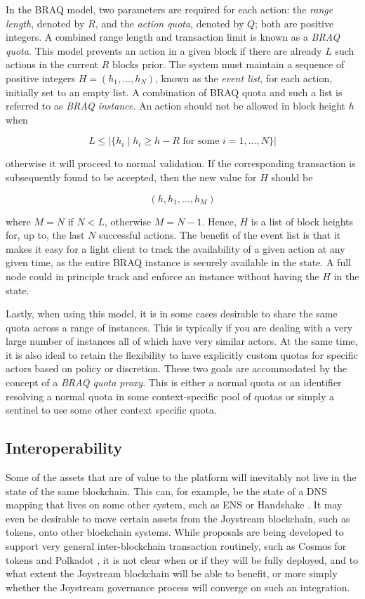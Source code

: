 \documentclass{article}
\begin{document}
In the BRAQ model, two parameters are required for each action: the \textit{range length}, denoted by $R$, and the \textit{action quota}, denoted by $Q$; both are positive integers. A combined range length and transaction limit is known as a \textit{BRAQ quota}. This model prevents an action in a given block if there are already $L$ such actions in the current $R$ blocks prior. The system must maintain a sequence of positive integers $H=(h_1, \ldots, h_N)$, known as the \textit{event list}, for each action, initially set to an empty list. A combination of BRAQ quota and such a list is referred to as \textit{BRAQ instance}.
An action should not be allowed in block height $h$ when

$$ L \leq | \{ h_i \mid h_i \geq h-R\mbox{ for some } i=1,\ldots,N\} |$$ %

otherwise it will proceed to normal validation. If the corresponding transaction is subsequently found to be accepted, then the new value for $H$ should be

$$ (h, h_1, \ldots, h_{M}) $$

where $M=N$ if $N < L$, otherwise $M = N - 1$. Hence, $H$ is a list of block heights for, up to, the last $N$ successful actions. The benefit of the event list is that it makes it easy for a light client to track the availability of a given action at any given time, as the entire BRAQ instance is securely available in the state. A full node could in principle track and enforce an instance without having the $H$ in the state.

Lastly, when using this model, it is in some cases desirable to share the same quota across a range of instances. This is typically if you are dealing with a very large number of instances all of which have very similar actors. At the same time, it is also ideal to retain the flexibility to have explicitly custom quotas for specific actors based on policy or discretion. These two goals are accommodated by the concept of a \textit{BRAQ quota proxy}. This is either a normal quota or an identifier resolving a normal quota in some context-specific pool of quotas or simply a sentinel to use some other context specific quota.

\subsection{Interoperability}

Some of the assets that are of value to the platform will inevitably not live in the state of the same blockchain. This can, for example, be the state of a DNS mapping that lives on some other system, such as ENS \cite{ens} or Handshake \cite{handshake}. It may even be desirable to move certain assets from the Joystream blockchain, such as tokens, onto other blockchain systems. While proposals are being developed to support very general inter-blockchain transaction routinely, such as Cosmos \cite{cosmos} for tokens and Polkadot \cite{polkadot}, it is not clear when or if they will be fully deployed, and to what extent the Joystream blockchain will be able to benefit, or more simply whether the Joystream governance process will converge on such an integration.
\end{document}
